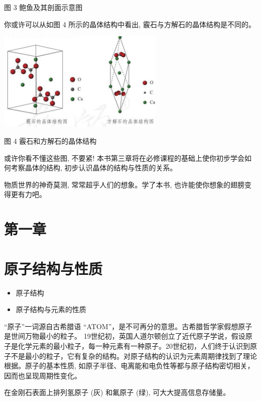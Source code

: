 \documentclass[10pt]{article}
\begin{document}
图 3 鲍鱼及其剖面示意图

你或许可以从如图 4 所示的晶体结构中看出, 霰石与方解石的晶体结构是不同的。

\begin{center}
\includegraphics[max width=0.6\textwidth]{images/0190e026-5a11-7df7-bd27-54d09026ba7a_7_311022.jpg}
\end{center}

图 4 霰石和方解石的晶体结构

或许你看不懂这些图, 不要紧! 本书第三章将在必修课程的基础上使你初步学会如何考察晶体的结构, 初步认识晶体的结构与性质的关系。

物质世界的神奇莫测, 常常超乎人们的想象。学了本书, 也许能使你想象的翅膀变得更有力吧。

\section*{第一章}

\section*{原子结构与性质}

\begin{itemize}
\item 原子结构
\end{itemize}

\begin{itemize}
\item 原子结构与元素的性质
\end{itemize}

“原子”一词源自古希腊语 “ATOM”，是不可再分的意思。古希腊哲学家假想原子是世间万物最小的粒子。 19世纪初，英国人道尔顿创立了近代原子学说，假设原子是化学元素的最小粒子，每一种元素有一种原子。20世纪初，人们终于认识到原子不是最小的粒子，它有复杂的结构。对原子结构的认识为元素周期律找到了理论根据。原子的基本性质, 如原子半径、电离能和电负性等都与原子结构密切相关，因而也呈现周期性变化。

在金刚石表面上排列氢原子 (灰) 和氟原子 (绿), 可大大提高信息存储量。
\end{document}

